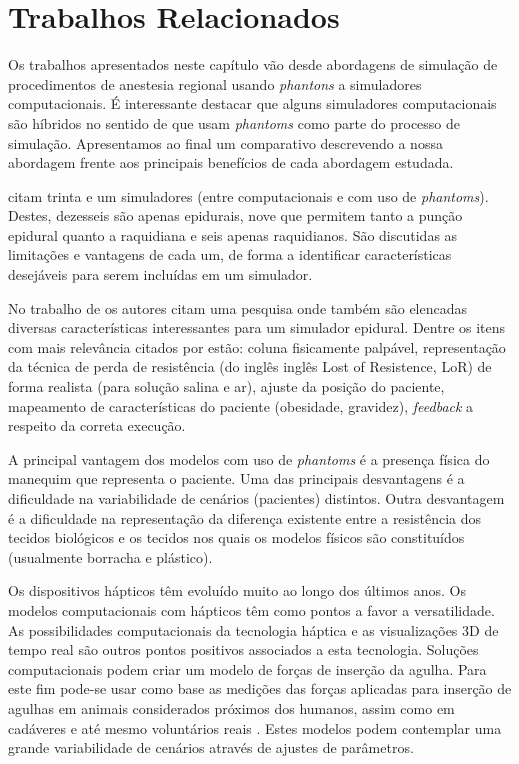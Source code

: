 \chapter{Trabalhos Relacionados} \label{cap:cap3}

Os trabalhos apresentados neste capítulo vão desde abordagens de simulação de procedimentos de anestesia regional usando \textit{phantons} a simuladores computacionais. É interessante destacar que alguns simuladores computacionais são híbridos no sentido de que usam \textit{phantoms} como parte do processo de simulação. Apresentamos ao final um comparativo descrevendo a nossa abordagem frente aos principais benefícios de cada abordagem estudada.  

\textcite{Vaughan2013} citam trinta e um simuladores (entre computacionais e com uso de \textit{phantoms}). Destes, dezesseis são apenas epidurais, nove que permitem tanto a punção epidural quanto a raquidiana e seis apenas raquidianos. São discutidas as limitações e vantagens de cada um, de forma a identificar características desejáveis para serem incluídas em um simulador. 

No trabalho de \textcite{Isaacs2015} os autores citam uma pesquisa onde também são elencadas diversas características interessantes para um simulador epidural. Dentre os itens com mais relevância citados por \textcite{Isaacs2015} estão: coluna fisicamente palpável, representação da técnica de perda de resistência (do inglês inglês Lost of Resistence, \acrshort{LoR}) de forma realista (para solução salina e ar), ajuste da posição do paciente, mapeamento de características do paciente (obesidade, gravidez), \textit{feedback} a respeito da correta execução.

A principal vantagem dos modelos com uso de \textit{phantoms} é a presença física do manequim que representa o paciente. Uma das principais desvantagens é a dificuldade na variabilidade de cenários (pacientes) distintos. Outra desvantagem é a dificuldade na representação da diferença existente entre a resistência dos tecidos biológicos e os tecidos nos quais os modelos físicos são constituídos (usualmente borracha e plástico).

Os dispositivos hápticos têm evoluído muito ao longo dos últimos anos. Os modelos computacionais com hápticos têm como pontos a favor a versatilidade. As possibilidades computacionais da tecnologia háptica e as visualizações 3D de tempo real são outros pontos positivos associados a esta tecnologia. 
Soluções computacionais podem criar um modelo de forças de inserção da agulha. Para este fim pode-se usar como base as medições das forças aplicadas para inserção de agulhas em animais considerados próximos dos humanos, assim como em cadáveres e até mesmo voluntários reais \cite{Hiemenz1998, Holton2001,Langton1990,McKay2010,Naemura2009,Tran2009,Vaughan2012}. Estes modelos podem contemplar uma grande variabilidade de cenários através de ajustes de parâmetros. 

